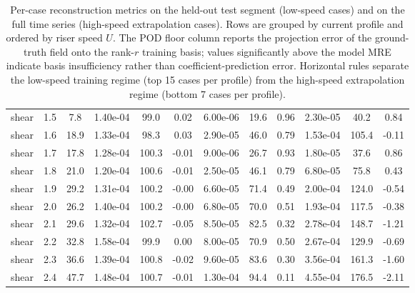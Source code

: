 \begin{table}[h!]
\begin{tabular}{ll c ccc ccc ccc}
shear & 1.5 & 7.8 & 1.40e-04 & 99.0 & 0.02 & 6.00e-06 & 19.6 & 0.96 & 2.30e-05 & 40.2 & 0.84 \\
shear & 1.6 & 18.9 & 1.33e-04 & 98.3 & 0.03 & 2.90e-05 & 46.0 & 0.79 & 1.53e-04 & 105.4 & -0.11 \\
shear & 1.7 & 17.8 & 1.28e-04 & 100.3 & -0.01 & 9.00e-06 & 26.7 & 0.93 & 1.80e-05 & 37.6 & 0.86 \\
\midrule
shear & 1.8 & 21.0 & 1.20e-04 & 100.6 & -0.01 & 2.50e-05 & 46.1 & 0.79 & 6.80e-05 & 75.8 & 0.43 \\
shear & 1.9 & 29.2 & 1.31e-04 & 100.2 & -0.00 & 6.60e-05 & 71.4 & 0.49 & 2.00e-04 & 124.0 & -0.54 \\
shear & 2.0 & 26.2 & 1.40e-04 & 100.2 & -0.00 & 6.80e-05 & 70.0 & 0.51 & 1.93e-04 & 117.5 & -0.38 \\
shear & 2.1 & 29.6 & 1.32e-04 & 102.7 & -0.05 & 8.50e-05 & 82.5 & 0.32 & 2.78e-04 & 148.7 & -1.21 \\
shear & 2.2 & 32.8 & 1.58e-04 & 99.9 & 0.00 & 8.00e-05 & 70.9 & 0.50 & 2.67e-04 & 129.9 & -0.69 \\
shear & 2.3 & 36.6 & 1.39e-04 & 100.8 & -0.02 & 9.60e-05 & 83.6 & 0.30 & 3.56e-04 & 161.3 & -1.60 \\
shear & 2.4 & 47.7 & 1.48e-04 & 100.7 & -0.01 & 1.30e-04 & 94.4 & 0.11 & 4.55e-04 & 176.5 & -2.11 \\
\bottomrule
\end{tabular}
\caption{Per-case reconstruction metrics on the held-out test segment (low-speed cases) and on the full time series (high-speed extrapolation cases). Rows are grouped by current profile and ordered by riser speed $U$. The POD floor column reports the projection error of the ground-truth field onto the rank-$r$ training basis; values significantly above the model MRE indicate basis insufficiency rather than coefficient-prediction error. Horizontal rules separate the low-speed training regime (top 15 cases per profile) from the high-speed extrapolation regime (bottom 7 cases per profile).}
\label{tab:ndp_5sensors_per_case}
\end{table}